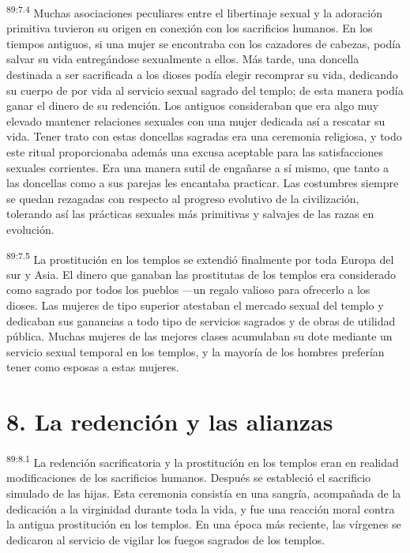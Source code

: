 \par
\textsuperscript{89:7.4} Muchas asociaciones peculiares entre el libertinaje sexual y la adoración primitiva tuvieron su origen en conexión con los sacrificios humanos. En los tiempos antiguos, si una mujer se encontraba con los cazadores de cabezas, podía salvar su vida entregándose sexualmente a ellos. Más tarde, una doncella destinada a ser sacrificada a los dioses podía elegir recomprar su vida, dedicando su cuerpo de por vida al servicio sexual sagrado del templo; de esta manera podía ganar el dinero de su redención. Los antiguos consideraban que era algo muy elevado mantener relaciones sexuales con una mujer dedicada así a rescatar su vida. Tener trato con estas doncellas sagradas era una ceremonia religiosa, y todo este ritual proporcionaba además una excusa aceptable para las satisfacciones sexuales corrientes. Era una manera sutil de engañarse a sí mismo, que tanto a las doncellas como a sus parejas les encantaba practicar. Las costumbres siempre se quedan rezagadas con respecto al progreso evolutivo de la civilización, tolerando así las prácticas sexuales más primitivas y salvajes de las razas en evolución.

\par
\textsuperscript{89:7.5} La prostitución en los templos se extendió finalmente por toda Europa del sur y Asia. El dinero que ganaban las prostitutas de los templos era considerado como sagrado por todos los pueblos ---un regalo valioso para ofrecerlo a los dioses. Las mujeres de tipo superior atestaban el mercado sexual del templo y dedicaban sus ganancias a todo tipo de servicios sagrados y de obras de utilidad pública. Muchas mujeres de las mejores clases acumulaban su dote mediante un servicio sexual temporal en los templos, y la mayoría de los hombres preferían tener como esposas a estas mujeres.

\section*{8. La redención y las alianzas}
\par
\textsuperscript{89:8.1} La redención sacrificatoria y la prostitución en los templos eran en realidad modificaciones de los sacrificios humanos. Después se estableció el sacrificio simulado de las hijas. Esta ceremonia consistía en una sangría, acompañada de la dedicación a la virginidad durante toda la vida, y fue una reacción moral contra la antigua prostitución en los templos. En una época más reciente, las vírgenes se dedicaron al servicio de vigilar los fuegos sagrados de los templos.

